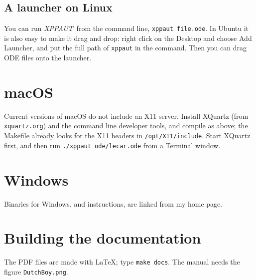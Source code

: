 \documentclass{article}
\newcommand{\XPP}{{\sl XPPAUT\, }}
\begin{document}
\subsection{A launcher on Linux}
You can run \XPP from the command line, {\tt xppaut file.ode}.  In Ubuntu it is also easy to
make it drag and drop: right click on the Desktop and choose Add Launcher, and put the full path of
{\tt xppaut} in the command.  Then you can drag ODE files onto the launcher.

\section{macOS}
Current versions of macOS do not include an X11 server.  Install XQuartz (from
{\tt xquartz.org}) and the command line developer tools, and compile as above; the Makefile already
looks for the X11 headers in {\tt /opt/X11/include}.  Start XQuartz first, and then run
{\tt ./xppaut ode/lecar.ode} from a Terminal window.

\section{Windows}
Binaries for Windows, and instructions, are linked from my home page.

\section{Building the documentation}
The PDF files are made with LaTeX; type {\tt make docs}.  The manual needs the figure {\tt DutchBoy.png}.
\end{document}
